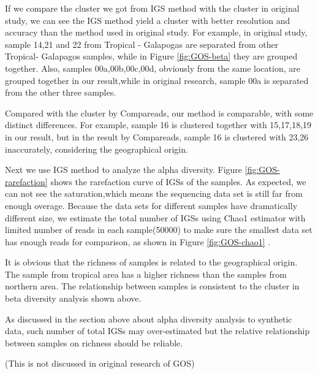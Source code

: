 \documentclass{article}
\begin{document}
If we compare the cluster we got from IGS method with the cluster in original study, we can see the IGS method yield a
cluster with better resolution and accuracy than the method used in original study. For example, in original study,
sample 14,21 and 22 from Tropical - Galapogas are separated from other Tropical- Galapagos samples, while in Figure \ref{fig:GOS-beta} 
they are grouped together. Also, samples 00a,00b,00c,00d, obviously from the same location, are grouped together in our result,while
in original research, sample 00a is separated from the other three samples.

Compared with the cluster by Compareads, our method is comparable, with some distinct differences. For example, sample 16 is clustered together with 15,17,18,19 in our result, but in the result by Compareads, sample 16 is clustered with 23,26 inaccurately, considering the geographical origin.

Next we use IGS method to analyze the alpha diversity. Figure \ref{fig:GOS-rarefaction} shows the rarefaction curve of IGSs of the samples.
As expected, we can not see the saturation,which means the sequencing data set is still far from enough overage. 
Because the data sets for different samples have dramatically different size, we estimate the total number of IGSs using Chao1 estimator with limited 
number of reads in each sample(50000) to make sure the smallest data set has enough reads for comparison, as shown in Figure \ref{fig:GOS-chao1} .

It is obvious that the richness of samples is related to the geographical origin. The sample from tropical area has a higher richness than
the samples from northern area. The relationship between samples is consistent to the cluster in beta diversity analysis shown above.

As discussed in the section above about alpha diversity analysis to synthetic data, such number of total IGSs may over-estimated but
the relative relationship between samples on richness should be reliable.

(This is not discussed in original research of GOS)
\end{document}
